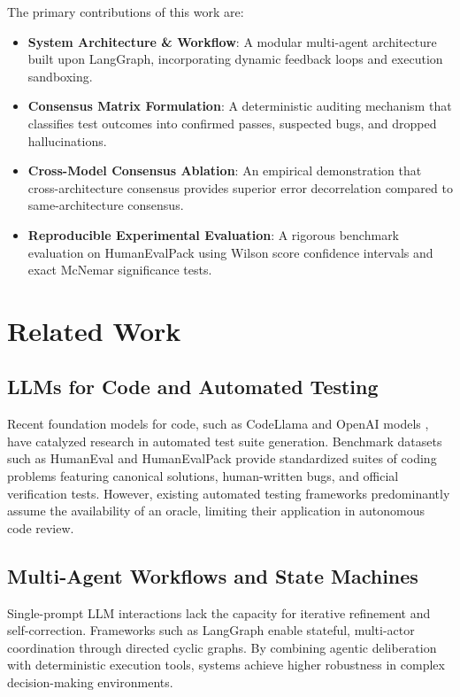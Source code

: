\documentclass[conference]{IEEEtran}
\begin{document}
The primary contributions of this work are:
\begin{itemize}
    \item \textbf{System Architecture \& Workflow}: A modular multi-agent architecture built upon LangGraph, incorporating dynamic feedback loops and execution sandboxing.
    \item \textbf{Consensus Matrix Formulation}: A deterministic auditing mechanism that classifies test outcomes into confirmed passes, suspected bugs, and dropped hallucinations.
    \item \textbf{Cross-Model Consensus Ablation}: An empirical demonstration that cross-architecture consensus provides superior error decorrelation compared to same-architecture consensus.
    \item \textbf{Reproducible Experimental Evaluation}: A rigorous benchmark evaluation on HumanEvalPack \cite{muennighoff2023octopack} using Wilson score confidence intervals and exact McNemar significance tests.
\end{itemize}

\section{Related Work}
\subsection{LLMs for Code and Automated Testing}
Recent foundation models for code, such as CodeLlama \cite{roziere2023code} and OpenAI models \cite{chen2021evaluating}, have catalyzed research in automated test suite generation. Benchmark datasets such as HumanEval and HumanEvalPack \cite{muennighoff2023octopack} provide standardized suites of coding problems featuring canonical solutions, human-written bugs, and official verification tests. However, existing automated testing frameworks predominantly assume the availability of an oracle, limiting their application in autonomous code review.

\subsection{Multi-Agent Workflows and State Machines}
Single-prompt LLM interactions lack the capacity for iterative refinement and self-correction. Frameworks such as LangGraph \cite{langgraph2024} enable stateful, multi-actor coordination through directed cyclic graphs. By combining agentic deliberation with deterministic execution tools, systems achieve higher robustness in complex decision-making environments.
\end{document}
